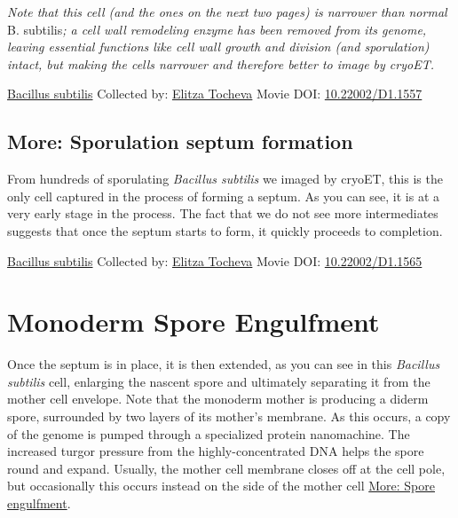 \documentclass[]{tufte-book}
\begin{document}
\emph{Note that this cell (and the ones on the next two pages) is narrower than normal }B. subtilis\emph{; a cell wall remodeling enzyme has been removed from its genome, leaving essential functions like cell wall growth and division (and sporulation) intact, but making the cells narrower and therefore better to image by cryoET.}



\hypertarget{htmlwidget-31b879dc71fa95af5dd6}{}

\label{fig:8-5}\protect\hyperlink{tree}{Bacillus subtilis} Collected by: \protect\hyperlink{elitza_tocheva}{Elitza Tocheva} Movie DOI: \href{https://doi.org/10.22002/D1.1557}{10.22002/D1.1557}

\hypertarget{Sporulation_septum_formation}{%
\subsection*{More: Sporulation septum formation}\label{Sporulation_septum_formation}}

From hundreds of sporulating \emph{Bacillus subtilis} we imaged by cryoET, this is the only cell captured in the process of forming a septum. As you can see, it is at a very early stage in the process. The fact that we do not see more intermediates suggests that once the septum starts to form, it quickly proceeds to completion.



\hypertarget{htmlwidget-556642c11945d9395f83}{}

\label{fig:8-5a}\protect\hyperlink{tree}{Bacillus subtilis} Collected by: \protect\hyperlink{elitza_tocheva}{Elitza Tocheva} Movie DOI: \href{https://doi.org/10.22002/D1.1565}{10.22002/D1.1565}

\hypertarget{monoderm-spore-engulfment}{%
\section{Monoderm Spore Engulfment}\label{monoderm-spore-engulfment}}

Once the septum is in place, it is then extended, as you can see in this \emph{Bacillus subtilis} cell, enlarging the nascent spore and ultimately separating it from the mother cell envelope. Note that the monoderm mother is producing a diderm spore, surrounded by two layers of its mother's membrane. As this occurs, a copy of the genome is pumped through a specialized protein nanomachine. The increased turgor pressure from the highly-concentrated DNA helps the spore round and expand. Usually, the mother cell membrane closes off at the cell pole, but occasionally this occurs instead on the side of the mother cell \protect\hyperlink{Spore_engulfment}{More: Spore engulfment}.
\end{document}
